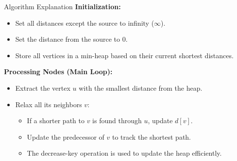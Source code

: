\documentclass{beamer}
\begin{document}
\begin{frame}{Algorithm Explanation}
    \textbf{Initialization:}
    \begin{itemize}
        \item Set all distances except the source to infinity ($\infty$).
        \item Set the distance from the source to 0.
        \item Store all vertices in a min-heap based on their current shortest distances.
    \end{itemize}
    \textbf{Processing Nodes (Main Loop):}
    \begin{itemize}
        \item Extract the vertex $u$ with the smallest distance from the heap.
        \item Relax all its neighbors $v$:
        \begin{itemize}
            \item If a shorter path to $v$ is found through $u$, update $d[v]$.
            \item Update the predecessor of $v$ to track the shortest path.
            \item The decrease-key operation is used to update the heap efficiently.
        \end{itemize}
    \end{itemize}
\end{frame}
\end{document}

